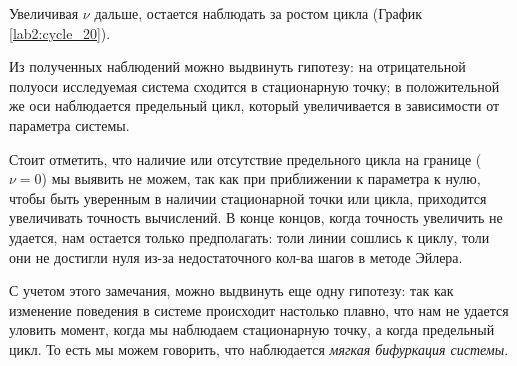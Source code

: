 Увеличивая $\nu$ дальше, остается наблюдать за ростом цикла (График
\ref{lab2:cycle_20}).

Из полученных наблюдений можно выдвинуть гипотезу: на отрицательной полуоси
исследуемая система сходится в стационарную точку; в положительной же оси
наблюдается предельный цикл, который увеличивается в зависимости от параметра
системы.

Стоит отметить, что наличие или отсутствие предельного цикла на границе
($\nu = 0$) мы выявить не можем, так как при приближении к параметра к нулю,
чтобы быть уверенным в наличии стационарной точки или цикла, приходится
увеличивать точность вычислений. В конце концов, когда точность увеличить
не удается, нам остается только предполагать: толи линии сошлись к циклу, толи
они не достигли нуля из-за недостаточного кол-ва шагов в методе Эйлера.

С учетом этого замечания, можно выдвинуть еще одну гипотезу: так как изменение
поведения в системе происходит настолько плавно, что нам не удается уловить
момент, когда мы наблюдаем стационарную точку, а когда предельный цикл.
То есть мы можем говорить, что наблюдается \textit{мягкая бифуркация системы}.
